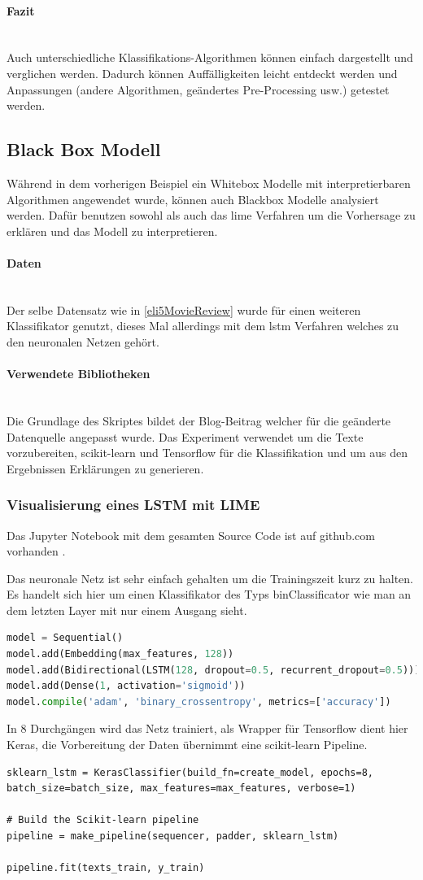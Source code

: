 \documentclass[
  12pt, %
  a4paper, %
  oneside, %
  openany, 
  numbers=noenddot, %
  BCOR=5mm, %
  parskip=half*, %
  thesis, %
]{bfhbook}
\newcommand{\parag}[1]{\paragraph*{#1}\mbox{}\\}
\begin{document}
\parag{Fazit}
Auch unterschiedliche Klassifikations-Algorithmen können einfach dargestellt und verglichen werden. Dadurch können Auffälligkeiten leicht entdeckt werden und Anpassungen (andere Algorithmen, geändertes Pre-Processing usw.) getestet werden. 

\subsection{Black Box Modell}
Während in dem vorherigen Beispiel ein \Gls{Whitebox} Modelle mit interpretierbaren Algorithmen angewendet wurde, können auch \Gls{Blackbox} Modelle analysiert werden. Dafür benutzen sowohl \cite{ELI5} als auch \cite{lime} das \acrshort{lime} Verfahren um die Vorhersage zu erklären und das Modell zu interpretieren.

\parag{Daten}
Der selbe Datensatz wie in \ref{eli5MovieReview} wurde für einen weiteren Klassifikator genutzt, dieses Mal allerdings mit dem \acrfull{lstm} Verfahren welches zu den neuronalen Netzen gehört. 

\parag{Verwendete Bibliotheken}
Die Grundlage des Skriptes bildet der Blog-Beitrag \parencite{nThLIME} welcher für die geänderte Datenquelle angepasst wurde. 
Das Experiment verwendet \cite{nltk} um die Texte vorzubereiten, scikit-learn \cite{scikit-learnLink} und Tensorflow \cite{TensorFlow} für die Klassifikation und \cite{ELI5} um aus den Ergebnissen Erklärungen zu generieren. 


\subsubsection*{Visualisierung eines LSTM  mit LIME}
Das Jupyter Notebook mit dem gesamten Source Code ist auf github.com vorhanden \parencite{textClassLSTM}.
 
 Das neuronale Netz ist sehr einfach gehalten um die Trainingszeit kurz zu halten. Es handelt sich hier um einen Klassifikator des Typs \Gls{binClassificator} wie man an dem letzten Layer mit nur einem Ausgang sieht.
\begin{lstlisting}[language=Python, caption=LSTM Modell für LIME Movie Sentiment Analyse]
model = Sequential()
model.add(Embedding(max_features, 128))
model.add(Bidirectional(LSTM(128, dropout=0.5, recurrent_dropout=0.5)))
model.add(Dense(1, activation='sigmoid'))
model.compile('adam', 'binary_crossentropy', metrics=['accuracy'])
\end{lstlisting}

In 8 Durchgängen wird das Netz trainiert, als Wrapper für Tensorflow dient hier Keras, die Vorbereitung der Daten übernimmt eine scikit-learn Pipeline.
\begin{lstlisting}
sklearn_lstm = KerasClassifier(build_fn=create_model, epochs=8, batch_size=batch_size, max_features=max_features, verbose=1)

# Build the Scikit-learn pipeline
pipeline = make_pipeline(sequencer, padder, sklearn_lstm)

pipeline.fit(texts_train, y_train)
\end{lstlisting}
\end{document}
